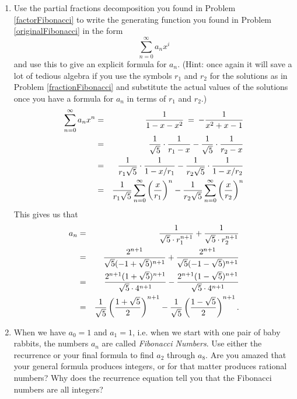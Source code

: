 \iteme
\begin{enumerate}
\item Use the partial fractions decomposition you found in
Problem
\ref{factorFibonacci} to write the generating function you found in
Problem \ref{originalFibonacci} in the form $$\sum_{n=0}^\infty a_nx^i$$
and use this to give an explicit formula for $a_n$.  (Hint: once again it
will save a lot of tedious algebra if you use the symbols $r_1$ and $r_2$
for the solutions as in Problem \ref{fractionFibonacci} and substitute
the actual values of the solutions once you have a formula for $a_n$ in
terms of $r_1$ and $r_2$.)  
\begin{eqnarray*}\sum_{n=0}^\infty a_nx^n &=&{1\over 1-x-x^2}\>=\>-{1\over
x^2+x-1}\\ 
&=&{1\over\sqrt{5}}\cdot{1\over r_1-x} -{1\over\sqrt{5}}\cdot{1\over r_2-x}\\
&=&{1\over r_1\sqrt{5}}\cdot{1\over1-x/r_1} -{1\over r_2\sqrt{5}}\cdot{1\over
1-x/r_2}\\ 
&=&{1\over r_1\sqrt{5}}\sum_{n=0}^\infty\left({x\over r_1}\right)^n
-{1\over r_2\sqrt{5}}\sum_{n=0}^\infty  \left({x\over r_2}\right)^n
\end{eqnarray*}
This gives us that \begin{eqnarray*}a_n&=&{1\over\sqrt{5}\cdot r_1^{n+1}}
+{1\over\sqrt{5}\cdot r_2^{n+1}}\\
&=&{2^{n+1}\over\sqrt{5}(-1+\sqrt{5})^{n+1}}
+{2^{n+1}\over\sqrt{5}(-1-\sqrt{5})^{n+1}}\\&=&{2^{n+1}(1+\sqrt{5})^{n+1}\over
\sqrt{5}\cdot
4^{n+1}}-{2^{n+1}(1-\sqrt{5})^{n+1}\over\sqrt{5}\cdot4^{n+1}}\\
&=&{1\over \sqrt{5}}\left({1+\sqrt{5}\over 2}\right)^{n+1}-
{1\over \sqrt{5}}\left({1-\sqrt{5} \over2}\right)^{n+1}.\end{eqnarray*}

\item When we have
$a_0=1$ and $a_1=1$, i.e. when we start with one pair of baby rabbits, the
numbers
$a_n$ are called {\em Fibonacci Numbers}.  Use
either the recurrence or your final formula to find $a_2$ through $a_8$. 
Are you amazed that your general formula produces integers, or for that
matter produces rational numbers?  Why does the recurrence equation tell
you that the Fibonacci numbers are all integers?  


\end{enumerate}
